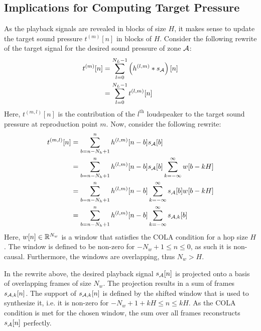 \subsection{Implications for Computing Target Pressure}
As the playback signals are revealed in blocks of size $H$, it makes sense to update the target sound pressure $t^{(m)}[n]$ in blocks of $H$.  
Consider the following rewrite of the target signal for the desired sound pressure of zone $\mathcal{A}$:
\begin{align}
    t^{(m)}[n] &= \sum_{l=0}^{N_L - 1} \left(h^{(l,m)} \ast s_{\mathcal{A}}\right)[n] \\
               &= \sum_{l=0}^{N_L - 1} t^{(l,m)}[n]
\end{align}
Here, $t^{(m,l)}[n]$ is the contribution of the $l^\text{th}$ loudspeaker to the target sound pressure at reproduction point $m$.
Now, consider the following rewrite:
\begin{align}
     t^{(m,l)}[n]   &= \sum_{b = n - N_h + 1}^{n} h^{(l,m)}[n - b] s_{\mathcal{A}}[b] \\
                    &= \sum_{b = n - N_h + 1}^{n} h^{(l,m)}[n - b] s_{\mathcal{A}}[b] 
                        \sum_{k=-\infty}^{\infty} w[b - kH] \\
                    &= \sum_{b = n - N_h + 1}^{n} h^{(l,m)}[n - b]  
                        \sum_{k=-\infty}^{\infty} s_{\mathcal{A}}[b] w[b - kH] \\
                    &= \sum_{b = n - N_h + 1}^{n} h^{(l,m)}[n - b]  
                        \sum_{k=-\infty}^{\infty} s_{\mathcal{A},k}[b]  
\end{align}
Here, $w[n]\in\mathbb{R}^{N_w}$ is a window that satisfies the COLA condition for a hop size $H$.
The window is defined to be non-zero for $-N_w + 1 \leq n \leq 0$, as such it is non-causal.
Furthermore, the windows are overlapping, thus $N_w > H$. 

In the rewrite above, the desired playback signal $s_{\mathcal{A}}[n]$ is projected onto a basis of overlapping frames of size $N_w$.
The projection results in a sum of frames $s_{\mathcal{A}, k}[n]$. 
The support of $s_{\mathcal{A}, k}[n]$ is defined by the shifted window that is used to synthesize it, i.e. it is non-zero for $-N_w + 1 + kH \leq n \leq kH$.
As the COLA condition is met for the chosen window, the sum over all frames reconstructs $s_{\mathcal{A}}[n]$ perfectly.

